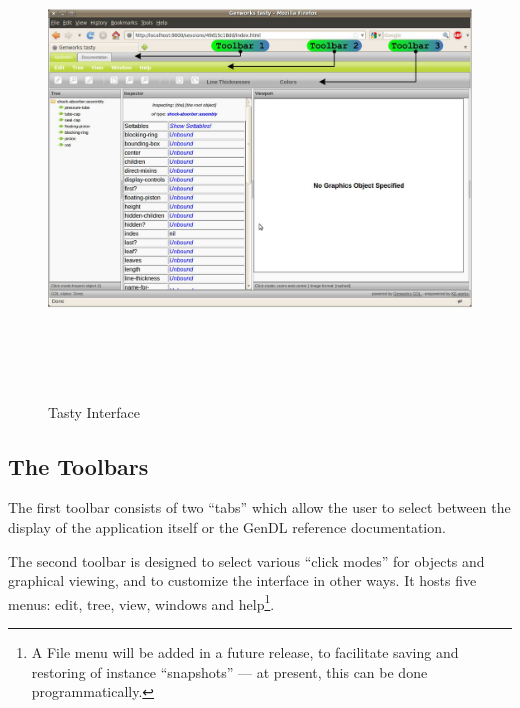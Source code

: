 \documentclass [11pt]{book}
\begin{document}
\begin{figure}
\begin{center}
\includegraphics[width=5in,height=5in]{../images/tasty-shock-absorber-pre.pdf}
\end{center}

\caption{Tasty Interface}

\label{fig:tastyshockabsorberpre}

\end{figure}


\subsection{The Toolbars}

\label{subsec:thetoolbars}



The first toolbar consists of two ``tabs'' which allow the
user to select between the display of the application itself or the
GenDL reference documentation.



The second toolbar is designed to select various ``click modes'' for
objects and graphical viewing, and to customize the interface in other
ways. It hosts five menus: edit, tree, view, windows and
help\footnote{A File menu will be added in a future release, to
facilitate saving and restoring of instance ``snapshots'' --- at
present, this can be done programmatically.}.
\end{document}
